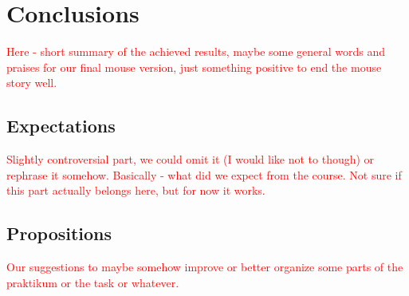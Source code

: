 \section{Conclusions}
\textcolor{red}{
Here - short summary of the achieved results, maybe some general words and praises for our final mouse version, just something positive to end the mouse story well.
}

\subsection{Expectations}
\textcolor{red}{
Slightly controversial part, we could omit it (I would like not to though) or rephrase it somehow. Basically - what did we expect from the course. Not sure if this part actually belongs here, but for now it works.
}
\subsection{Propositions}
\textcolor{red}{
Our suggestions to maybe somehow improve or better organize some parts of the praktikum or the task or whatever.
}


